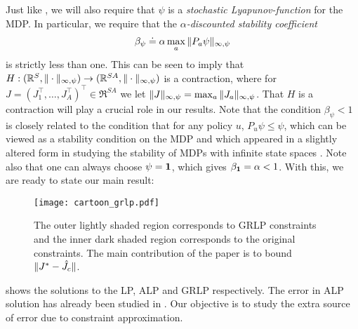 \documentclass[12pt,draftcls,onecolumn]{IEEEtran}
\begin{document}
Just like \citet{ALP}, we will also require that $\psi$ is a \emph{stochastic Lyapunov-function} for the MDP.  In particular, we require that the \emph{$\alpha$-discounted stability coefficient} 
\begin{align} \label{eq:betadef}
\beta_\psi \doteq \alpha  \max_{a} \norm{P_a \psi}_{\infty,\psi}
\end{align}
is strictly less than one.
This can be seen to imply that $H: (\mathbb{R}^S,\|\cdot\|_{\infty,\psi}) \to (\mathbb{R}^{SA}, \|\cdot\|_{\infty,\psi})$ is a contraction,
where for $J = (J_1^\top,\dots,J_A^\top)^\top \in \Re^{SA}$ we let $\|J\|_{\infty,\psi} = \max_a\|J_a\|_{\infty,\psi}$.
That $H$ is a contraction will play a crucial role in our results.
Note that the condition $\beta_\psi<1$ is closely related to the condition that for any policy $u$, 
$P_u \psi \le \psi$, which can be viewed as a stability condition on the MDP 
and which appeared in a slightly altered form in studying the stability of MDPs with infinite 
state spaces \citep[e.g.,][]{chemey99a}.
Note also that one can always choose $\psi = \mathbf{1}$, which gives $\beta_{\mathbf{1}} = \alpha<1$. 
With this, we are ready to state our main result:


\FloatBarrier
%
\begin{figure}
\texttt{[image: cartoon\_grlp.pdf]}
\caption{
The outer lightly shaded region corresponds to GRLP constraints and the inner dark shaded region corresponds to the original constraints. The main contribution of the paper is to bound $\|J^*-\hat{J}_c\|$.}
\label{cartoon}
\end{figure}
 shows the solutions to the LP, ALP and GRLP respectively. The error in ALP solution has already been studied in \cite{ALP}. Our objective is to study the extra source of error due to constraint approximation.
\fi
\end{document}
